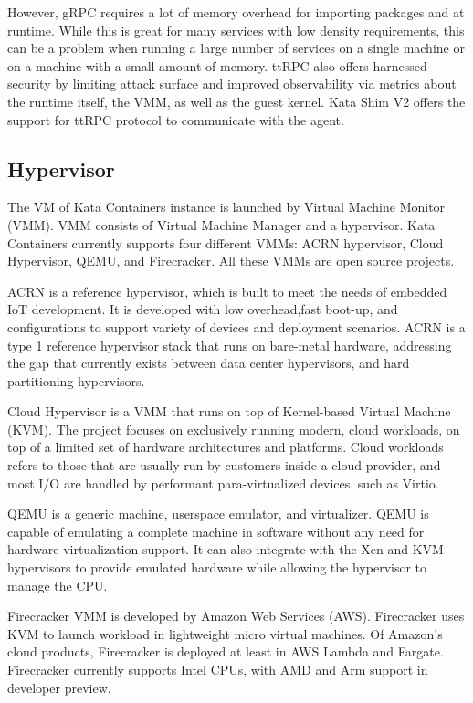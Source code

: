 However, gRPC requires a lot of memory overhead for importing packages and at runtime. While this is great for many services with low density requirements, this can be a problem when running a large number of services on a single machine or on a machine with a small amount of memory. ttRPC also offers harnessed security by limiting attack surface and improved observability via metrics about the runtime itself, the VMM, as well as the guest kernel. Kata Shim V2 offers the support for ttRPC protocol to communicate with the agent. \cite{ttRPC}

\subsection{Hypervisor}

The VM of Kata Containers instance is launched by Virtual Machine Monitor (VMM). VMM consists of Virtual Machine Manager and a hypervisor. Kata Containers currently supports four different VMMs: ACRN hypervisor, Cloud Hypervisor, QEMU, and Firecracker. All these VMMs are open source projects.

ACRN is a reference hypervisor, which is built to meet the needs of embedded IoT development. It is developed with low overhead,fast boot-up, and configurations to support variety of devices and deployment scenarios. ACRN is a type 1 reference hypervisor stack that runs on bare-metal hardware, addressing the gap that currently exists between data center hypervisors, and hard partitioning hypervisors. \cite{ACRN}

Cloud Hypervisor is a VMM that runs on top of Kernel-based Virtual Machine (KVM). The project focuses on exclusively running modern, cloud workloads, on top of a limited set of hardware architectures and platforms. Cloud workloads refers to those that are usually run by customers inside a cloud provider, and most I/O are handled by performant para-virtualized devices, such as Virtio. \cite{CloudHypervisor}

QEMU is a generic machine, userspace emulator, and virtualizer. QEMU is capable of emulating a complete machine in software without any need for hardware virtualization support. It can also integrate with the Xen and KVM hypervisors to provide emulated hardware while allowing the hypervisor to manage the CPU. \cite{QEMUGithub}\cite{QEMU}

Firecracker VMM is developed by Amazon Web Services (AWS). Firecracker uses KVM to launch workload in lightweight micro virtual machines. Of Amazon's cloud products, Firecracker is deployed at least in AWS Lambda and Fargate. Firecracker currently supports Intel CPUs, with AMD and Arm support in developer preview. \cite{AWS}\cite{FirecrackerDesign}\cite{Debab2021}

